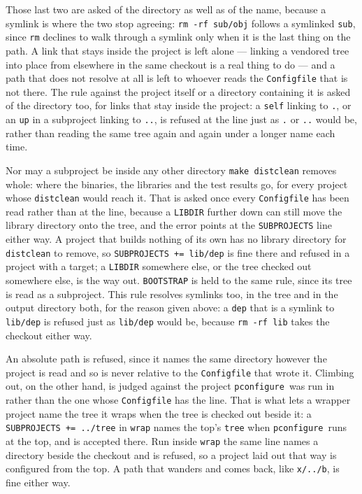 \documentclass{article}
\newcommand{\pconfigure}{\texttt{pconfigure}}
\begin{document}
Those last two are asked of the directory as well as of the name,
because a symlink is where the two stop agreeing: \texttt{rm -rf
sub/obj} follows a symlinked \texttt{sub}, since \texttt{rm} declines
to walk through a symlink only when it is the last thing on the path.
A link that stays inside the project is left alone --- linking a
vendored tree into place from elsewhere in the same checkout is a real
thing to do --- and a path that does not resolve at all is left to
whoever reads the \texttt{Configfile} that is not there.  The rule
against the project itself or a directory containing it is asked of
the directory too, for links that stay inside the project: a
\texttt{self} linking to \texttt{.}, or an \texttt{up} in a
subproject linking to \texttt{..}, is refused at the line just as
\texttt{.} or \texttt{..} would be, rather than reading the same tree
again and again under a longer name each time.

Nor may a subproject be inside any other directory \texttt{make
distclean} removes whole: where the binaries, the libraries and the
test results go, for every project whose \texttt{distclean} would
reach it.  That is asked once every \texttt{Configfile} has been read rather than at
the line, because a \texttt{LIBDIR} further down can still move the
library directory onto the tree, and the error points at the
\texttt{SUBPROJECTS} line either way.  A project that builds nothing
of its own has no library directory for \texttt{distclean} to
remove, so \texttt{SUBPROJECTS += lib/dep} is fine there and refused
in a project with a target; a \texttt{LIBDIR} somewhere else, or the
tree checked out somewhere else, is the way out.  \texttt{BOOTSTRAP}
is held to the same rule, since its tree is read as a subproject.
This rule resolves symlinks too, in the tree and in the output
directory both, for the reason given above: a \texttt{dep} that is a
symlink to \texttt{lib/dep} is refused just as \texttt{lib/dep}
would be, because \texttt{rm -rf lib} takes the checkout either way.

An absolute path is refused, since it names the same directory
however the project is read and so is never relative to the
\texttt{Configfile} that wrote it.  Climbing out, on the other hand,
is judged against the project \pconfigure\ was run in rather than
the one whose \texttt{Configfile} has the line.  That is what lets a
wrapper project name the tree it wraps when the tree is checked out
beside it: a \texttt{SUBPROJECTS += ../tree} in \texttt{wrap} names
the top's \texttt{tree} when \pconfigure\ runs at the top, and is
accepted there.  Run inside \texttt{wrap} the same line names a
directory beside the checkout and is refused, so a project laid out
that way is configured from the top.  A path that wanders and comes
back, like \texttt{x/../b}, is fine either way.
\end{document}
